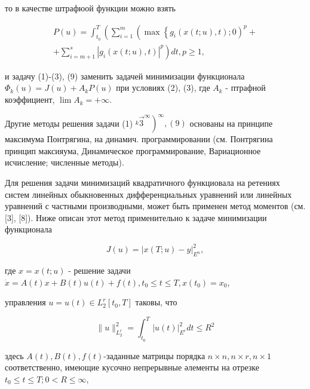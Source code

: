 \documentclass[10pt]{article}
\begin{document}
то в качестве штрафюой функции можно взять



\[

\begin{gathered}

P(u)=\int_{t_{0}}^{T}\left(\sum _ { i = 1 } ^ { m } \left(\max \left\{g_{i}(x(t ; u), t) ; 0\right)^{p}+\right.\right. \\

\left.+\sum_{i=m+1}^{s}\left|g_{i}(x(t ; u), t)\right|^{p}\right) d t, p \geqslant 1,

\end{gathered}

\]



и задачу (1)-(3), (9) заменить задачей минимизации функционала $\Phi_{k}(u)=J(u)+A_{k} P(u)$ при условиях (2), (3), где $A_{k}$ - птрафной коэффициент, $\lim A_{k}=+\infty$.



Другие методы решения задачи (1) $\left.\stackrel{k}{ } \overrightarrow{3}^{\infty}\right)^{\infty},(9)$ основаны на принципе максимума Понтрягина, на динамич. программировании (см. Понтрягина принцип максияума, Динамическое программирование, Вариационное исчисление; численные методы).



Для решения задачи минимизаций квадратичного функциовала на ретениях систем линейных обыкновенных дифференциальных уравнений или линейных уравнений с частными производными, может быть применен метод моментов (см. [3], [8]). Ниже описан этот метод применительно к задаче минимизации функционала



\[

J(u)=|x(T ; u)-y|_{E^{n}}^{2},

\]



где $x=x(t ; u)$ - решение задачи $\dot{x}=A(t) x+B(t) u(t)+f(t), t_{0} \leqslant t \leqslant T, x\left(t_{0}\right)=x_{0}$,



управления $u=u(t) \in L_{2}^{r}\left[t_{0}, T\right]$ таковы, что



\[

\|u\|_{L_{2}^{r}}^{2}=\int_{t_{0}}^{T}|u(t)|_{E^{r}}^{2} d t \leqslant R^{2}

\]



здесь $A(t), B(t), f(t)$-заданные матрицы порядка $n \times n, n \times r, n \times 1$ соответственно, имеющие кусочно непрерывные әлементы на отрезке $t_{0} \leqslant t \leqslant T ; 0<R \leqslant \infty$,
\end{document}
